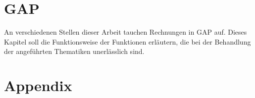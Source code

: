 \documentclass[12pt,titlepage,twoside,cleardoublepage]{article}
\theoremstyle{nummermitklammern}
\newtheorem{bemerkung}[temp]{Bemerkung}
\newtheorem{satz}[temp]{Satz}
\newtheorem{bemerkung}[zahl]{Bemerkung}
\newtheorem{satz}[zahl]{Satz}
\numberwithin{equation}{section}
\begin{document}
\section{GAP}
An verschiedenen Stellen dieser Arbeit tauchen Rechnungen in GAP auf. Dieses Kapitel soll die Funktionsweise der Funktionen erläutern, die bei der Behandlung der angeführten Thematiken unerlässlich sind. 

\section*{Appendix}
\end{document}
